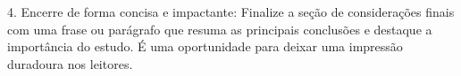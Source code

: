 \documentclass[
	article,			%
	12pt,				%
	oneside,			%
	a4paper,			%
    BIBLATEX,           %
	english,			%
	brazil,				%
	sumario=tradicional
	]{abntex2}
\begin{document}
4. Encerre de forma concisa e impactante: Finalize a seção de considerações finais com uma frase ou parágrafo que resuma as principais conclusões e destaque a importância do estudo. É uma oportunidade para deixar uma impressão duradoura nos leitores.

\postextual


%
%
\end{document}
